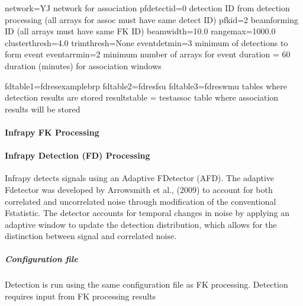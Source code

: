 \documentclass[letterpaper,10pt,english]{sphinxmanual}
\begin{document}
\begin{sphinxVerbatim}[commandchars=\\\{\}]
[AssocLocParams]
network=YJ
\PYGZsh{} network for association
pfdetectid=0
\PYGZsh{} detection ID from detection processing (all arrays for assoc must have same detect ID)
pfkid=2
\PYGZsh{} beamforming ID (all arrays must have same FK ID)
beamwidth=10.0
rangemax=1000.0
clusterthresh=4.0
trimthresh=None
eventdetmin=3
\PYGZsh{} minimum \PYGZsh{} of detections to form event
eventarrmin=2
\PYGZsh{} minimum number of arrays for event
duration = 60
\PYGZsh{} duration (minutes) for association windows

fdtable\PYGZus{}1=fd\PYGZus{}res\PYGZus{}example\PYGZus{}brp
\PYGZsh{}fdtable\PYGZus{}2=fd\PYGZus{}res\PYGZus{}fsu
\PYGZsh{}fdtable\PYGZus{}3=fd\PYGZus{}res\PYGZus{}wmu
\PYGZsh{} tables where detection results are stored
resultstable = test\PYGZus{}assoc
\PYGZsh{} table where association results will be stored
\end{sphinxVerbatim}


\paragraph{Infrapy FK Processing}
\label{\detokenize{fk:infrapy-fk-processing}}\label{\detokenize{fk:fk}}\label{\detokenize{fk::doc}}
\begin{sphinxVerbatim}[commandchars=\\\{\}]
    
\end{sphinxVerbatim}


\paragraph{Infrapy Detection (FD) Processing}
\label{\detokenize{fd:infrapy-detection-fd-processing}}\label{\detokenize{fd:fd}}\label{\detokenize{fd::doc}}
Infrapy detects signals using an Adaptive F\sphinxhyphen{}Detector (AFD). The adaptive F\sphinxhyphen{}detector was developed by Arrowsmith et al., (2009) to account for both correlated and uncorrelated noise through modification of the conventional F\sphinxhyphen{}statistic. The detector accounts for temporal changes in noise by applying an adaptive window to update the detection distribution, which allows for the distinction between signal and correlated noise.

\noindent{}


\subparagraph{Configuration file}
\label{\detokenize{fd:configuration-file}}
Detection is run using the same configuration file as FK processing.  Detection requires input from FK processing results
\end{document}
